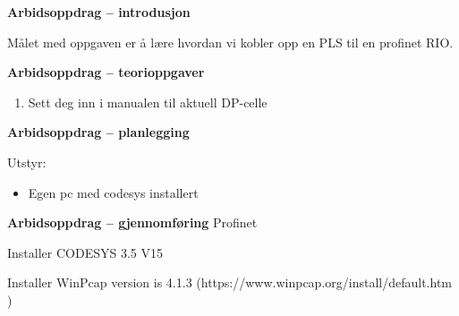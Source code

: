 

\noindent

\vskip 5pt


\textbf{Arbidsoppdrag -- introdusjon}

Målet med oppgaven er å lære hvordan vi kobler opp en PLS til en profinet RIO.



\textbf{Arbidsoppdrag -- teorioppgaver}

\begin{enumerate}
	\item Sett deg inn i manualen til aktuell DP-celle
\end{enumerate}
\textbf{Arbidsoppdrag -- planlegging}

Utstyr:
\begin{itemize}[noitemsep]
	\item Egen pc med codesys installert 
\end{itemize}

\textbf{Arbidsoppdrag -- gjennomføring}
Profinet 

 

Installer CODESYS 3.5 V15 

Installer WinPcap version is 4.1.3  (https://www.winpcap.org/install/default.htm )

